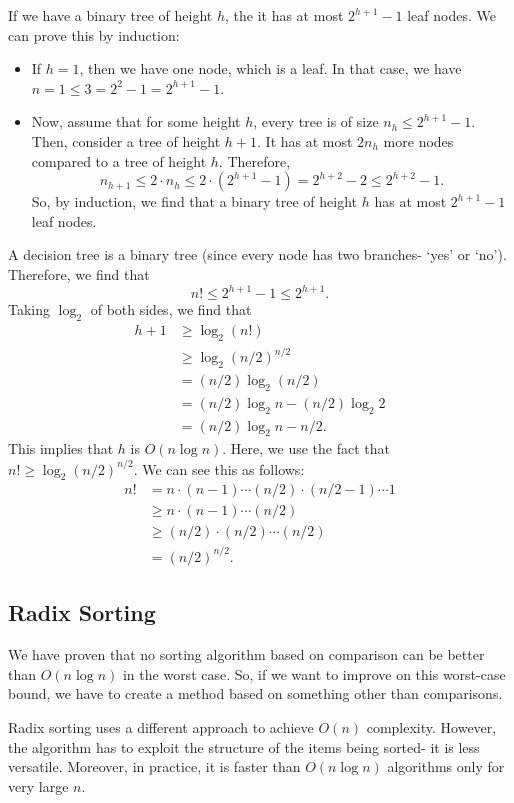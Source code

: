 \documentclass[a4paper, openany]{memoir}
\begin{document}
If we have a binary tree of height $h$, the it has at most $2^{h+1} - 1$ leaf nodes. We can prove this by induction:
\begin{itemize}
    \item If $h = 1$, then we have one node, which is a leaf. In that case, we have $n = 1 \leq 3 = 2^2 - 1 = 2^{h+1} - 1$.
    \item Now, assume that for some height $h$, every tree is of size $n_h \leq 2^{h+1} - 1$. Then, consider a tree of height $h+1$. It has at most $2n_h$ more nodes compared to a tree of height $h$. Therefore,
    \[n_{h+1} \leq 2\cdot n_h \leq 2 \cdot (2^{h+1} - 1) = 2^{h+2} - 2 \leq 2^{h+2} - 1.\]
    So, by induction, we find that a binary tree of height $h$ has at most $2^{h+1} - 1$ leaf nodes.
\end{itemize}

A decision tree is a binary tree (since every node has two branches- `yes' or `no'). Therefore, we find that
\[n! \leq 2^{h+1} - 1 \leq 2^{h+1}.\]
Taking $\log_2$ of both sides, we find that
\begin{align*}
    h+1 &\geq \log_2(n!) \\
    &\geq \log_2 (n/2)^{n/2} \\
    &= (n/2) \log_2 (n/2) \\
    &= (n/2) \log_2 n - (n/2) \log_2 2 \\
    &= (n/2) \log_2 n - n/2.
\end{align*}
This implies that $h$ is $O(n \log n)$. Here, we use the fact that $n! \geq \log_2 (n/2)^{n/2}$. We can see this as follows:
\begin{align*}
    n! &= n \cdot (n-1) \cdots (n/2) \cdot (n/2-1) \cdots  1 \\
    &\geq n \cdot (n-1) \cdots (n/2) \\
    &\geq (n/2) \cdot (n/2) \cdots (n/2) \\
    &= (n/2)^{n/2}.
\end{align*}

\subsection{Radix Sorting}
We have proven that no sorting algorithm based on comparison can be better than $O(n \log n)$ in the worst case. So, if we want to improve on this worst-case bound, we have to create a method based on something other than comparisons. 

Radix sorting uses a different approach to achieve $O(n)$ complexity. However, the algorithm has to exploit the structure of the items being sorted- it is less versatile. Moreover, in practice, it is faster than $O(n \log n)$ algorithms only for very large $n$.
\end{document}
